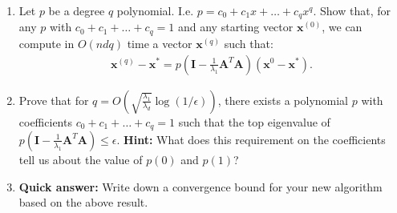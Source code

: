 \documentclass[10pt]{article}
\newcommand{\bv}[1]{\mathbf{#1}}
\begin{document}
\begin{enumerate}
	\item Let $p$ be a degree $q$ polynomial. I.e. $p = c_0 + c_1 x + \ldots + c_q x^q$. Show that, for any $p$ with $c_0 + c_1 + \ldots + c_q = 1$ and any starting vector $\bv{x}^{(0)}$, we can compute in $O(ndq)$ time a vector $\bv{x}^{(q)}$ such that:
	\begin{align*}
		\bv{x}^{(q)} - \bv{x}^* = p\left(\bv{I} - \frac{1}{\lambda_1}\bv{A}^T\bv{A}\right)(\bv{x}^{0} - \bv{x}^*).
	\end{align*}
	\item Prove that for $q = O(\sqrt{\frac{\lambda_1}{\lambda_d}} \log(1/\epsilon))$, there exists a polynomial $p$ with coefficients $c_0 + c_1 + \ldots + c_q = 1$ such that the top eigenvalue of $p\left(\bv{I} - \frac{1}{\lambda_1}\bv{A}^T\bv{A}\right) \leq \epsilon$. \textbf{Hint:} What does this requirement on the coefficients tell us about the value of $p(0)$ and $p(1)$? 
	\item \textbf{Quick answer:} Write down a convergence bound for your new algorithm based on the above result. 
\end{enumerate}
\end{document}
